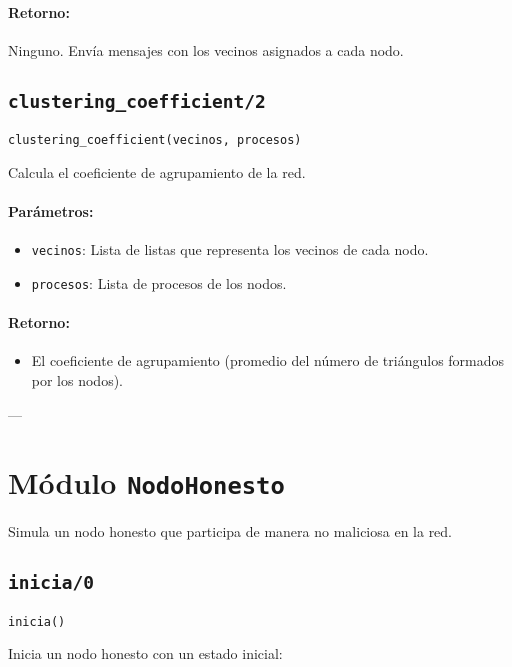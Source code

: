 {\paragraph{Retorno:}
Ninguno. Envía mensajes con los vecinos asignados a cada nodo.

\subsection*{\texttt{clustering\_coefficient/2}}
\begin{verbatim}
clustering_coefficient(vecinos, procesos)
\end{verbatim}

Calcula el coeficiente de agrupamiento de la red.

\paragraph{Parámetros:}
\begin{itemize}
    \item \texttt{vecinos}: Lista de listas que representa los vecinos de cada nodo.
    \item \texttt{procesos}: Lista de procesos de los nodos.
\end{itemize}

\paragraph{Retorno:}
\begin{itemize}
    \item El coeficiente de agrupamiento (promedio del número de triángulos formados por los nodos).
\end{itemize}

---

\section*{Módulo \texttt{NodoHonesto}}
Simula un nodo honesto que participa de manera no maliciosa en la red.

\subsection*{\texttt{inicia/0}}
\begin{verbatim}
inicia()
\end{verbatim}

Inicia un nodo honesto con un estado inicial:

}

